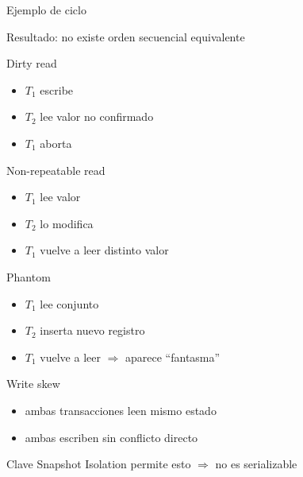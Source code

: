 \documentclass[institutional,screen,none]{ua-engineering-v6-beamer}
\begin{document}
\begin{frame}{Ejemplo de ciclo}
\begin{center}
\end{center}

\pause
Resultado: no existe orden secuencial equivalente
\end{frame}


\begin{frame}{Dirty read}
\begin{itemize}
\item $T_1$ escribe
\item $T_2$ lee valor no confirmado
\item $T_1$ aborta
\end{itemize}
\end{frame}

\begin{frame}{Non-repeatable read}
\begin{itemize}
\item $T_1$ lee valor
\item $T_2$ lo modifica
\item $T_1$ vuelve a leer distinto valor
\end{itemize}
\end{frame}

\begin{frame}{Phantom}
\begin{itemize}
\item $T_1$ lee conjunto
\item $T_2$ inserta nuevo registro
\item $T_1$ vuelve a leer $\Rightarrow$ aparece “fantasma”
\end{itemize}
\end{frame}

\begin{frame}{Write skew}
\begin{itemize}
\item ambas transacciones leen mismo estado
\item ambas escriben sin conflicto directo
\end{itemize}

\pause
\begin{alertblock}{Clave}
Snapshot Isolation permite esto $\Rightarrow$ no es serializable
\end{alertblock}
\end{frame}
\end{document}
